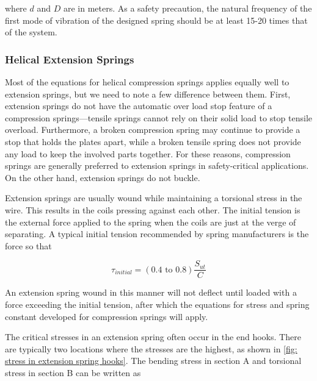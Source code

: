 \documentclass[a4paper,openany,nobib]{tufte-book}
\begin{document}
{{where \(d\) and \(D\) are in meters. As a safety precaution, the natural
frequency of the first mode of vibration of the designed spring should
be at least 15-20 times that of the system.

\subsubsection{Helical Extension Springs}
\label{helical-extension-springs}
Most of the equations for helical compression springs applies equally
well to extension springs, but we need to note a few difference between
them. First, extension springs do not have the automatic over load stop
feature of a compression springs---tensile springs cannot rely on their
solid load to stop tensile overload. Furthermore, a broken compression
spring may continue to provide a stop that holds the plates apart, while
a broken tensile spring does not provide any load to keep the involved
parts together. For these reasons, compression springs are generally
preferred to extension springs in safety-critical applications. On the
other hand, extension springs do not buckle.

Extension springs are usually wound while maintaining a torsional stress
in the wire. This results in the coils pressing against each other. The
initial tension is the external force applied to the spring when the
coils are just at the verge of separating. A typical initial tension
recommended by spring manufacturers is the force so that

$$\tau_{initial} = (0.4 \text{ to } 0.8)\frac{S_{ut}}{C}$$

An extension spring wound in this manner will not deflect until loaded
with a force exceeding the initial tension, after which the equations
for stress and spring constant developed for compression springs will
apply.

The critical stresses in an extension spring often occur in the end
hooks. There are typically two locations where the stresses are the
highest, as shown in
\ref{fig: stress in extension spring hooks}.
The bending stress in section A and torsional stress in section B can be
written as

}}
\end{document}
